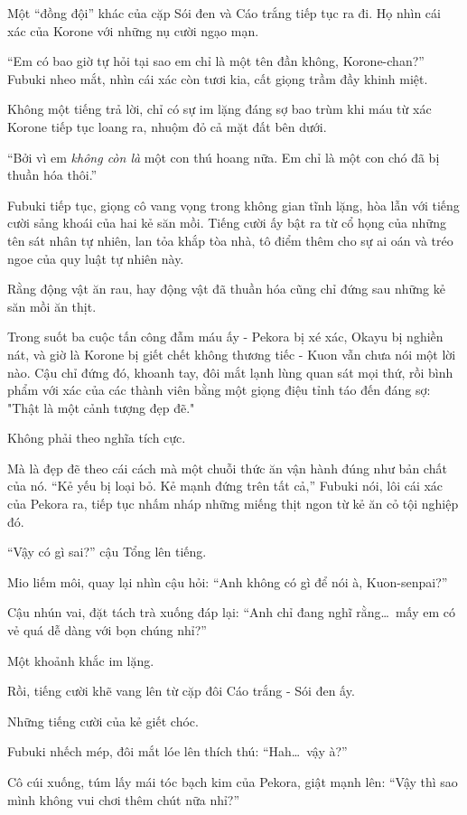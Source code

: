 \documentclass[../main.tex]{subfiles}
\begin{document}
Một ``đồng đội'' khác của cặp Sói đen và Cáo trắng tiếp tục ra đi. Họ nhìn cái xác của Korone với những nụ cười ngạo mạn.

``Em có bao giờ tự hỏi tại sao em chỉ là một tên đần không, Korone-chan?'' Fubuki nheo mắt, nhìn cái xác còn tươi kia, cất giọng trầm đầy khinh miệt.

Không một tiếng trả lời, chỉ có sự im lặng đáng sợ bao trùm khi máu từ xác Korone tiếp tục loang ra, nhuộm đỏ cả mặt đất bên dưới.

``Bởi vì em \emph{không còn là} một con thú hoang nữa. Em chỉ là một con chó đã bị thuần hóa thôi.''

Fubuki tiếp tục, giọng cô vang vọng trong không gian tĩnh lặng, hòa lẫn với tiếng cười sảng khoái của hai kẻ săn mồi. Tiếng cười ấy bật ra từ cổ họng của những tên sát nhân tự nhiên, lan tỏa khắp tòa nhà, tô điểm thêm cho sự ai oán và tréo ngoe của quy luật tự nhiên này.

Rằng động vật ăn rau, hay động vật đã thuần hóa cũng chỉ đứng sau những kẻ săn mồi ăn thịt.

Trong suốt ba cuộc tấn công đẫm máu ấy - Pekora bị xé xác, Okayu bị nghiền nát, và giờ là Korone bị giết chết không thương tiếc - Kuon vẫn chưa nói một lời nào. Cậu chỉ đứng đó, khoanh tay, đôi mắt lạnh lùng quan sát mọi thứ, rồi bình phẩm với xác của các thành viên bằng một giọng điệu tỉnh táo đến đáng sợ: "Thật là một cảnh tượng đẹp đẽ."

Không phải theo nghĩa tích cực.

Mà là đẹp đẽ theo cái cách mà một chuỗi thức ăn vận hành đúng như bản chất của nó. ``Kẻ yếu bị loại bỏ. Kẻ mạnh đứng trên tất cả,'' Fubuki nói, lôi cái xác của Pekora ra, tiếp tục nhấm nháp những miếng thịt ngon từ kẻ ăn cỏ tội nghiệp đó.

``Vậy có gì sai?'' cậu Tổng lên tiếng.

Mio liếm môi, quay lại nhìn cậu hỏi: ``Anh không có gì để nói à, Kuon-senpai?''

Cậu nhún vai, đặt tách trà xuống đáp lại: ``Anh chỉ đang nghĩ rằng\dots\ mấy em có vẻ quá dễ dàng với bọn chúng nhỉ?''

Một khoảnh khắc im lặng.

Rồi, tiếng cười khẽ vang lên từ cặp đôi Cáo trắng - Sói đen ấy.

Những tiếng cười của kẻ giết chóc.

Fubuki nhếch mép, đôi mắt lóe lên thích thú: ``Hah\dots\ vậy à?''

Cô cúi xuống, túm lấy mái tóc bạch kim của Pekora, giật mạnh lên: ``Vậy thì sao mình không vui chơi thêm chút nữa nhỉ?''
\end{document}
